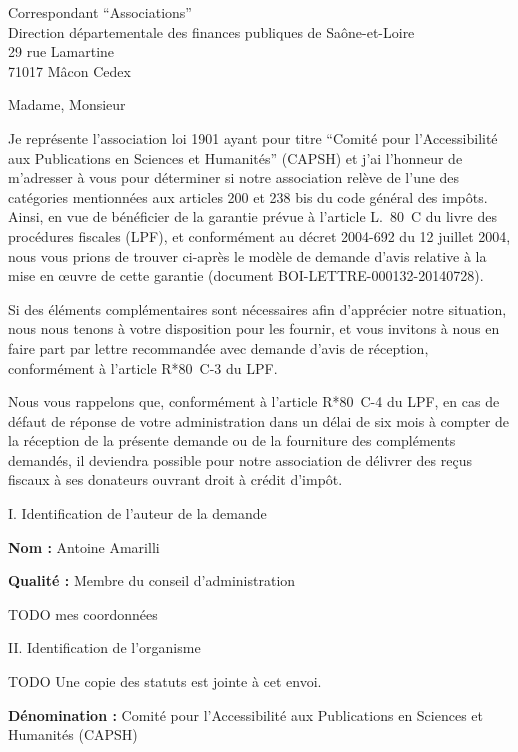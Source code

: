 \documentclass[11pt]{lettre}
\makeatletter
\newcommand*{\NoRule}{\renewcommand*{\rule@length}{0}}
\makeatother
\begin{document}
\begin{letter}{Correspondant ``Associations''\\Direction départementale des finances publiques de Saône-et-Loire\\29 rue Lamartine\\71017 Mâcon Cedex}
\NoRule
{}
\signature{}
\address{Antoine Amarilli TODO mon adresse}
\nofax
{}
\telephone{}
\email{}
\opening{Madame, Monsieur}

  Je représente l'association loi 1901 ayant pour titre ``Comité pour
  l'Accessibilité aux Publications en Sciences et Humanités'' (CAPSH) et j'ai l'honneur
  de m'adresser à vous pour déterminer si notre association relève de l'une des
  catégories mentionnées aux articles 200 et 238 bis du code général des impôts.
  Ainsi, en vue de bénéficier de la garantie prévue à l'article L.~80~C du
  livre des procédures fiscales (LPF), et conformément au décret 2004-692 du 12
  juillet 2004, nous vous prions de trouver ci-après le modèle de demande d'avis
  relative à la mise en œuvre de cette garantie (document BOI-LETTRE-000132-20140728).

  Si des éléments complémentaires sont nécessaires afin d'apprécier notre
  situation, nous nous tenons à votre disposition pour les
  fournir, et vous invitons à nous en faire part par lettre recommandée avec
  demande d'avis de réception, conformément à l'article R*80~C-3 du LPF.

  Nous vous rappelons que, conformément à l'article R*80~C-4 du LPF, en cas de
  défaut de réponse de votre administration dans un délai de six mois à compter
  de la réception de la présente demande ou de la fourniture des compléments
  demandés, il deviendra possible pour notre association de délivrer des reçus
  fiscaux à ses donateurs ouvrant droit à crédit d'impôt.

  \newpage

  {\Large I. Identification de l'auteur de la demande}

  \textbf{Nom :} Antoine Amarilli

  \textbf{Qualité :} Membre du conseil d'administration

  TODO mes coordonnées

  \bigskip
  {\Large II. Identification de l'organisme}

  TODO Une copie des statuts est jointe à cet envoi.

  \textbf{Dénomination :} Comité pour l'Accessibilité aux Publications en Sciences
  et Humanités (CAPSH)


\end{letter}
\end{document}

